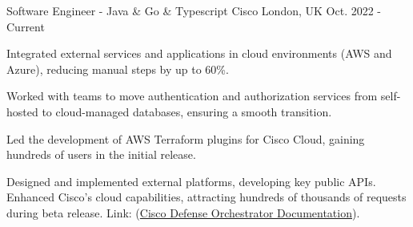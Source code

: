 

\begin{cventries}


\cventry
    {Software Engineer - Java \& Go \& Typescript} %
    {Cisco} %
    {London, UK} %
    {Oct. 2022 - Current} %
    {
      \begin{cvitems} %
        \item {Integrated external services and applications in cloud environments (AWS and Azure), reducing manual steps by up to 60\%.}
        \item {Worked with teams to move authentication and authorization services from self-hosted to cloud-managed databases, ensuring a smooth transition.}
        \item {Led the development of AWS Terraform plugins for Cisco Cloud, gaining hundreds of users in the initial release.}
        \item {Designed and implemented external platforms, developing key public APIs. Enhanced Cisco's cloud capabilities, attracting hundreds of thousands of requests during beta release. Link: (\href{https://developer.cisco.com/docs/cisco-defense-orchestrator/}{Cisco Defense Orchestrator Documentation}).}
      \end{cvitems}
    }


\end{cventries}
